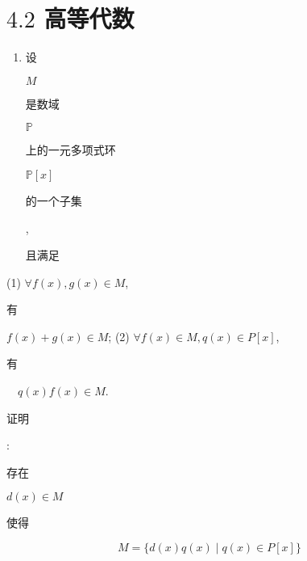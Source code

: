 \documentclass[10pt]{article}
\begin{document}
\section{$4.2$ 高等代数}
\begin{enumerate}
  \item \begin{CJK}{UTF8}{mj}设\end{CJK} $M$ \begin{CJK}{UTF8}{mj}是数域\end{CJK} $\mathbb{P}$ \begin{CJK}{UTF8}{mj}上的一元多项式环\end{CJK} $\mathbb{P}[x]$ \begin{CJK}{UTF8}{mj}的一个子集\end{CJK}, \begin{CJK}{UTF8}{mj}且满足\end{CJK}
\end{enumerate}
(1) $\forall f(x), g(x) \in M$, \begin{CJK}{UTF8}{mj}有\end{CJK} $f(x)+g(x) \in M$; (2) $\forall f(x) \in M, q(x) \in P[x]$, \begin{CJK}{UTF8}{mj}有\end{CJK} $\quad q(x) f(x) \in M$.

\begin{CJK}{UTF8}{mj}证明\end{CJK}: \begin{CJK}{UTF8}{mj}存在\end{CJK} $d(x) \in M$ \begin{CJK}{UTF8}{mj}使得\end{CJK}
$$
M=\{d(x) q(x) \mid q(x) \in P[x]\}
$$
\end{document}
